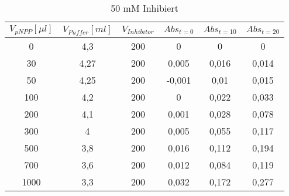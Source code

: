 \begin{table}[H]
  \centering
  \caption{50 mM Inhibiert}
    \begin{tabular}{cccccc}
    \midrule
    $V_{pNPP} [\mu l]$ & $V_{Puffer} [ml]$ & $V_{Inhibitor}$ &$Abs_{t=0}$ & $Abs_{t=10}$ & $Abs_{t=20}$\\
    \midrule
    0     & 4,3   & 200   & 0     & 0     & 0 \\
    30    & 4,27  & 200   & 0,005 & 0,016 & 0,014 \\
    50    & 4,25  & 200   & -0,001 & 0,01  & 0,015 \\
    100   & 4,2   & 200   & 0     & 0,022 & 0,033 \\
    200   & 4,1   & 200   & 0,001 & 0,028 & 0,078 \\
    300   & 4     & 200   & 0,005 & 0,055 & 0,117 \\
    500   & 3,8   & 200   & 0,016 & 0,112 & 0,194 \\
    700   & 3,6   & 200   & 0,012 & 0,084 & 0,119 \\
    1000  & 3,3   & 200   & 0,032 & 0,172 & 0,277 \\
    \bottomrule
    \end{tabular}%
  \label{tab:addlabel}%
\end{table}%